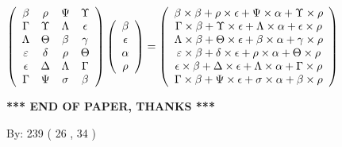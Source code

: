 \documentclass[12pt]{article}
\begin{document}
$  %
 \left( \begin{array}
 {
 c
 c
 c
 c
 }
 \beta & 
 \rho & 
 \Psi & 
 \Upsilon \\ 
 \Gamma & 
 \Upsilon & 
 \Lambda & 
 \epsilon \\ 
 \Lambda & 
 \Theta & 
 \beta & 
 \gamma \\ 
 \varepsilon & 
 \delta & 
 \rho & 
 \Theta \\ 
 \epsilon & 
 \Delta & 
 \Lambda & 
 \Gamma \\ 
 \Gamma & 
 \Psi & 
 \sigma & 
 \beta
 \end{array} \right)
 \left( \begin{array}
 {
 c
 }
 \beta \\ 
 \epsilon \\ 
 \alpha \\ 
 \rho
 \end{array} \right)
=
  \left( \begin{array}
 {
 c
 }
 \beta \times  \beta   +  \rho \times  \epsilon   +  \Psi \times  \alpha   +  \Upsilon \times  \rho \\ 
 \Gamma \times  \beta   +  \Upsilon \times  \epsilon   +  \Lambda \times  \alpha   +  \epsilon \times  \rho \\ 
 \Lambda \times  \beta   +  \Theta \times  \epsilon   +  \beta \times  \alpha   +  \gamma \times  \rho \\ 
 \varepsilon \times  \beta   +  \delta \times  \epsilon   +  \rho \times  \alpha   +  \Theta \times  \rho \\ 
 \epsilon \times  \beta   +  \Delta \times  \epsilon   +  \Lambda \times  \alpha   +  \Gamma \times  \rho \\ 
 \Gamma \times  \beta   +  \Psi \times  \epsilon   +  \sigma \times  \alpha   +  \beta \times  \rho
 \end{array} \right)
$
 
 
 
   
   
 \vspace{0.2in}
 
   
   
   
   
\vspace{1.0in} 
{\textbf{\large{ *** END OF PAPER, THANKS *** }}} 
   
   
\hspace{1.0in} By: 
 239 ( 26 ,  34 )
   
   
   
   
\newpage 
\setcounter{page}{ 
    32001 } 
   
\end{document}
